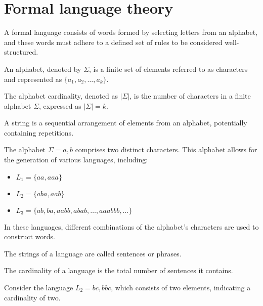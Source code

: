\section{Formal language theory}

A formal language consists of words formed by selecting letters from an alphabet, and these words must adhere to a defined set of rules to be considered well-structured.
\begin{definition}
    An alphabet, denoted by $\Sigma$, is a finite set of elements referred to as characters and represented as $\{a_1,a_2,\dots,a_k\}$. 
\end{definition}
\begin{definition}
    The alphabet cardinality, denoted as $\left\lvert\Sigma\right\rvert$, is the number of characters in a finite alphabet $\Sigma$, expressed as $\left\lvert\Sigma\right\rvert=k$.
\end{definition}
\begin{definition}
    A string is a sequential arrangement of elements from an alphabet, potentially containing repetitions.
\end{definition}
\begin{example}
    The alphabet $\Sigma={a,b}$ comprises two distinct characters.
    This alphabet allows for the generation of various languages, including:
    \begin{itemize}
        \item $L_1=\{aa,aaa\}$
        \item $L_2=\{aba,aab\}$
        \item $L_3=\{ab,ba,aabb,abab,\dots,aaabbb,\dots\}$
    \end{itemize}
    In these languages, different combinations of the alphabet's characters are used to construct words.
\end{example}
\begin{definition}
    The strings of a language are called sentences or phrases. 
\end{definition}
\begin{definition}
    The cardinality of a language is the total number of sentences it contains.
\end{definition}
\begin{example}
    Consider the language $L_2={ bc, bbc }$, which consists of two elements, indicating a cardinality of two.
\end{example}
